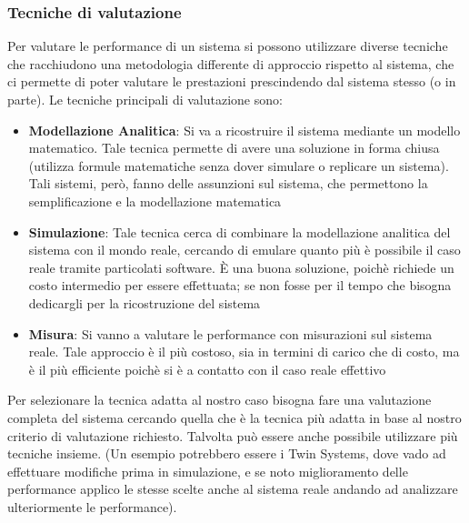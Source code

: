 \subsubsection{Tecniche di valutazione}
Per valutare le performance di un sistema si possono utilizzare diverse tecniche che racchiudono una metodologia differente di approccio rispetto al sistema, che ci permette di poter valutare le prestazioni prescindendo dal sistema stesso (o in parte). Le tecniche principali di valutazione sono:
\begin{itemize}
    \item \textbf{Modellazione Analitica}: Si va a ricostruire il sistema mediante un modello matematico. Tale tecnica permette di avere una soluzione in forma chiusa (utilizza formule matematiche senza dover simulare o replicare un sistema). Tali sistemi, però, fanno delle assunzioni sul sistema, che permettono la semplificazione e la modellazione matematica
    
    \item \textbf{Simulazione}: Tale tecnica cerca di combinare la modellazione analitica del sistema con il mondo reale, cercando di emulare quanto più è possibile il caso reale tramite particolati software. \uppercase{è} una buona soluzione, poichè richiede un costo intermedio per essere effettuata; se non fosse per il tempo che bisogna dedicargli per la ricostruzione del sistema
    
    \item \textbf{Misura}: Si vanno a valutare le performance con misurazioni sul sistema reale. Tale approccio è il più costoso, sia in termini di carico che di costo, ma è il più efficiente poichè si è a contatto con il caso reale effettivo
\end{itemize}

Per selezionare la tecnica adatta al nostro caso bisogna fare una valutazione completa del sistema cercando quella che è la tecnica più adatta in base al nostro criterio di valutazione richiesto. Talvolta può essere anche possibile utilizzare più tecniche insieme. (Un esempio potrebbero essere i Twin Systems, dove vado ad effettuare modifiche prima in simulazione, e se noto miglioramento delle performance applico le stesse scelte anche al sistema reale andando ad analizzare ulteriormente le performance).

